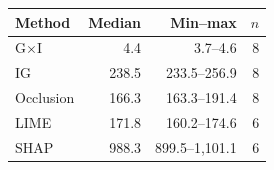 \begin{tabular}{lrrr}
\toprule
Method & Median & Min--max & $n$ \\
\midrule
G$\times$I & 4.4 & 3.7--4.6 & 8 \\
IG & 238.5 & 233.5--256.9 & 8 \\
Occlusion & 166.3 & 163.3--191.4 & 8 \\
LIME & 171.8 & 160.2--174.6 & 6 \\
SHAP & 988.3 & 899.5--1,101.1 & 6 \\
\bottomrule
\end{tabular}
